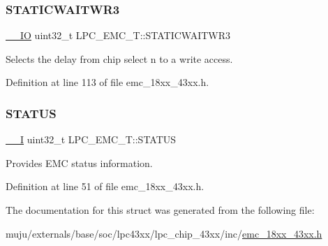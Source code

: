 \subsubsection{\texorpdfstring{S\+T\+A\+T\+I\+C\+W\+A\+I\+T\+W\+R3}{STATICWAITWR3}}
{\footnotesize\ttfamily \hyperlink{core__sc300_8h_aec43007d9998a0a0e01faede4133d6be}{\+\_\+\+\_\+\+IO} uint32\+\_\+t L\+P\+C\+\_\+\+E\+M\+C\+\_\+\+T\+::\+S\+T\+A\+T\+I\+C\+W\+A\+I\+T\+W\+R3}

Selects the delay from chip select n to a write access. 

Definition at line 113 of file emc\+\_\+18xx\+\_\+43xx.\+h.

\mbox{\label{struct_l_p_c___e_m_c___t_a84374b5f8ed91b53530950468d49e1c6}} 
\subsubsection{\texorpdfstring{S\+T\+A\+T\+US}{STATUS}}
{\footnotesize\ttfamily \hyperlink{core__sc300_8h_af63697ed9952cc71e1225efe205f6cd3}{\+\_\+\+\_\+I} uint32\+\_\+t L\+P\+C\+\_\+\+E\+M\+C\+\_\+\+T\+::\+S\+T\+A\+T\+US}

Provides E\+MC status information. 

Definition at line 51 of file emc\+\_\+18xx\+\_\+43xx.\+h.



The documentation for this struct was generated from the following file\+:\begin{DoxyCompactItemize}
\item 
muju/externals/base/soc/lpc43xx/lpc\+\_\+chip\+\_\+43xx/inc/\hyperlink{emc__18xx__43xx_8h}{emc\+\_\+18xx\+\_\+43xx.\+h}\end{DoxyCompactItemize}
